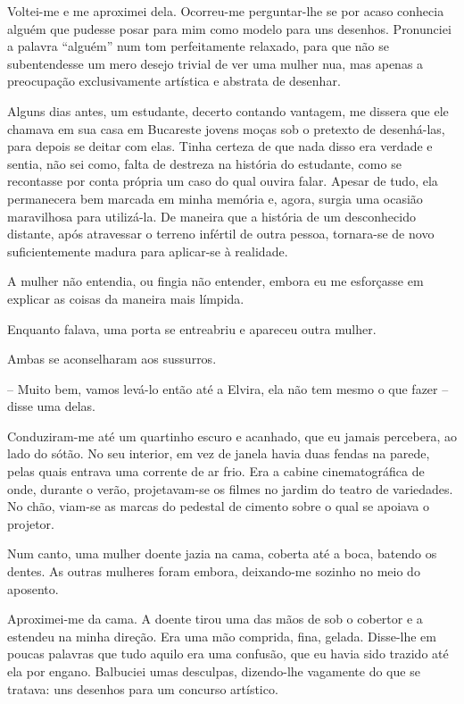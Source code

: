 Voltei-me e me aproximei dela. Ocorreu-me perguntar-lhe se por acaso conhecia alguém que pudesse posar para mim como modelo para uns desenhos. Pronunciei a palavra ``alguém'' num tom perfeitamente relaxado, para que não se subentendesse um mero desejo trivial de ver uma mulher nua, mas apenas a preocupação exclusivamente artística e abstrata de desenhar.

Alguns dias antes, um estudante, decerto contando vantagem, me dissera que ele chamava em sua casa em Bucareste jovens moças sob o pretexto de desenhá-las, para depois se deitar com elas. Tinha certeza de que nada disso era verdade e sentia, não sei como, falta de destreza na história do estudante, como se recontasse por conta própria um caso do qual ouvira falar. Apesar de tudo, ela permanecera bem marcada em minha memória e, agora, surgia uma ocasião maravilhosa para utilizá-la. De maneira que a história de um desconhecido distante, após atravessar o terreno infértil de outra pessoa, tornara-se de novo suficientemente madura para aplicar-se à realidade.

A mulher não entendia, ou fingia não entender, embora eu me esforçasse em explicar as coisas da maneira mais límpida.

Enquanto falava, uma porta se entreabriu e apareceu outra mulher.

Ambas se aconselharam aos sussurros.

-- Muito bem, vamos levá-lo então até a Elvira, ela não tem mesmo o que fazer -- disse uma delas.

Conduziram-me até um quartinho escuro e acanhado, que eu jamais percebera, ao lado do sótão. No seu interior, em vez de janela havia duas fendas na parede, pelas quais entrava uma corrente de ar frio. Era a cabine cinematográfica de onde, durante o verão, projetavam-se os filmes no jardim do teatro de variedades. No chão, viam-se as marcas do pedestal de cimento sobre o qual se apoiava o projetor.

Num canto, uma mulher doente jazia na cama, coberta até a boca, batendo os dentes. As outras mulheres foram embora, deixando-me sozinho no meio do aposento.

Aproximei-me da cama. A doente tirou uma das mãos de sob o cobertor e a estendeu na minha direção. Era uma mão comprida, fina, gelada. Disse-lhe em poucas palavras que tudo aquilo era uma confusão, que eu havia sido trazido até ela por engano. Balbuciei umas desculpas, dizendo-lhe vagamente do que se tratava: uns desenhos para um concurso artístico.

